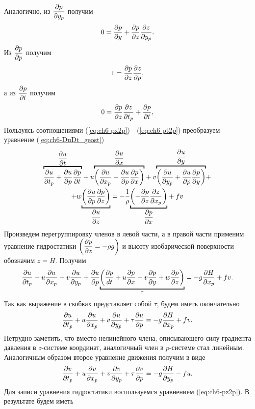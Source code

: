     Аналогично, из $\displaystyle\frac{\partial p}{\partial y_p}$ получим
    \begin{equation}
        \label{eq:ch6-py2p}
        0=\displaystyle\frac{\partial p}{\partial y}+\displaystyle\frac{\partial p}{\partial z}\displaystyle\frac{\partial z}{\partial y_p}.
    \end{equation}
    Из $\displaystyle\frac{\partial p}{\partial p}$ получим
    \begin{equation}
        \label{eq:ch6-pz2p}
        1=\displaystyle\frac{\partial p}{\partial z}\displaystyle\frac{\partial z}{\partial p},
    \end{equation}
    а из $\displaystyle\frac{\partial p}{\partial t}$ получим
    \begin{equation}
        \label{eq:ch6-pt2p}
        0=\displaystyle\frac{\partial p}{\partial z}\displaystyle\frac{\partial z}{\partial t_p}+\displaystyle\frac{\partial p}{\partial t},
    \end{equation}
    Пользуясь соотношениями (\ref{eq:ch6-px2p}) - (\ref{eq:ch6-pt2p}) преобразуем уравнение (\ref{eq:ch6-DuDt_geost})
    \begin{multline*} 
        {\ob{\pd{u}{t_p}+\pd{u}{p}\pd{p}{t}}^{\pd{u}{t}}}+
        u{\ob{\left( \pd{u}{x_p} + \pd{u}{p}\pd{p}{x} \right)}^{\pd{u}{x}}} +
        v{\ob{\left( \pd{u}{y_p} + \pd{u}{p}\pd{p}{y} \right)}^{\pd{u}{y}}} + \\
        + w{\ub{\left( \pd{u}{p}\pd{p}{z} \right)}_{\pd{u}{z}}} = 
         -\frac{1}{\rho} {\ub{\left( -\pd{p}{z}\pd{z}{x_p} \right)}_{\pd{p}{x}}} + fv
    \end{multline*}
    Произведем перегруппировку членов в левой части, а в правой части применим уравнение гидростатики $\left( \displaystyle\frac{\partial p}{\partial z}=-\rho g \right)$ и высоту изобарической поверхности обозначим $z=H$. Получим
    \begin{equation*}
        \pd{u}{t_p}+u\pd{u}{x_p}+v\pd{u}{y_p}+
        \pd{u}{p} {\ub{ \left( \fd{p} \right) }_{\tau}} = - g \pd{H}{x_p}+fv.
    \end{equation*}
    Так как выражение в скобках представляет собой $\tau$, будем иметь окончательно
    \begin{equation}
        \label{eq:ch6-DuDt2p}
        \displaystyle\frac{\partial u}{\partial t_p}+u\displaystyle\frac{\partial u}{\partial x_p}+v\displaystyle\frac{\partial u}{\partial y_p}+
        \tau\displaystyle\frac{\partial u}{\partial p} = -g \displaystyle\frac{\partial H}{\partial x_p}+fv.
    \end{equation}
    Нетрудно заметить, что вместо нелинейного члена, описывающего силу градиента давления в $z$-системе координат, аналогичный член в $p$-системе стал линейным.
    Аналогичным образом второе уравнение движения получим в виде 
    \begin{equation}
        \label{eq:ch6-DvDt2p}
        \displaystyle\frac{\partial v}{\partial t_p}+u\displaystyle\frac{\partial v}{\partial x_p}+v\displaystyle\frac{\partial v}{\partial y_p}+
        \tau\displaystyle\frac{\partial v}{\partial p} = - g \displaystyle\frac{\partial H}{\partial y_p}-fu.
    \end{equation}
    Для записи уравнения гидростатики воспользуемся уравнением (\ref{eq:ch6-pz2p}). В результате будем иметь
